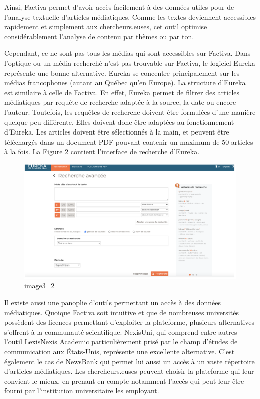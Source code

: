 \documentclass[
  letterpaper,
]{scrbook}
\begin{document}
Ainsi, Factiva permet d'avoir accès facilement à des données utiles pour
de l'analyse textuelle d'articles médiatiques. Comme les textes
deviennent accessibles rapidement et simplement aux chercheurs.euses,
cet outil optimise considérablement l'analyse de contenu par thèmes ou
par ton.

Cependant, ce ne sont pas tous les médias qui sont accessibles sur
Factiva. Dans l'optique ou un média recherché n'est pas trouvable sur
Factiva, le logiciel Eureka représente une bonne alternative. Eureka se
concentre principalement sur les médias francophones (autant au Québec
qu'en Europe). La structure d'Eureka est similaire à celle de Factiva.
En effet, Eureka permet de filtrer des articles médiatiques par requête
de recherche adaptée à la source, la date ou encore l'auteur. Toutefois,
les requêtes de recherche doivent être formulées d'une manière quelque
peu différente. Elles doivent donc être adaptées au fonctionnement
d'Eureka. Les articles doivent être sélectionnés à la main, et peuvent
être téléchargés dans un document PDF pouvant contenir un maximum de 50
articles à la fois. La Figure 2 contient l'interface de recherche
d'Eureka.

\begin{figure}

{\centering \includegraphics{images/chapitre3_eureka.png}

}

\caption{image3\_2}

\end{figure}

Il existe aussi une panoplie d'outils permettant un accès à des données
médiatiques. Quoique Factiva soit intuitive et que de nombreuses
universités possèdent des licences permettant d'exploiter la plateforme,
plusieurs alternatives s'offrent à la communauté scientifique. NexisUni,
qui comprend entre autres l'outil LexisNexis Academic particulièrement
prisé par le champ d'études de communication aux États-Unis, représente
une excellente alternative. C'est également le cas de NewsBank qui
permet lui aussi un accès à un vaste répertoire d'articles médiatiques.
Les chercheurs.euses peuvent choisir la plateforme qui leur convient le
mieux, en prenant en compte notamment l'accès qui peut leur être fourni
par l'institution universitaire les employant.
\end{document}
